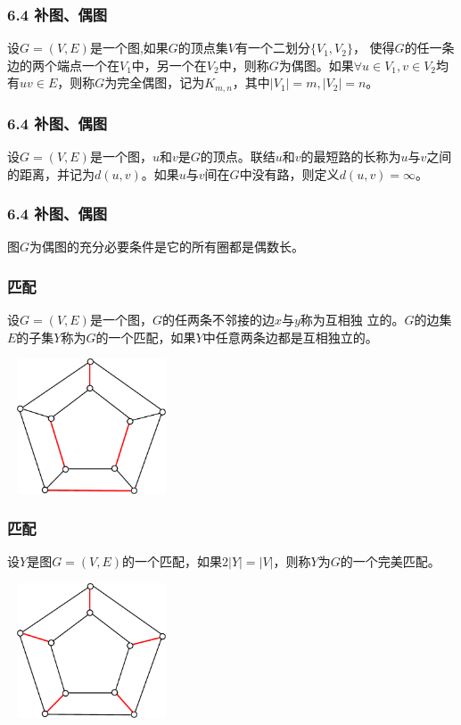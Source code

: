 \documentclass{beamer}
\begin{document}
\begin{CJK}{UTF8}{gbsn}
\begin{frame}
  \frametitle{6.4 补图、偶图}
  \begin{definition6.4.2}
    设$G=(V,E)$是一个图,如果$G$的顶点集$V$有一个二划分$\{V_1,V_2\}$，
    使得$G$的任一条边的两个端点一个在$V_1$中，另一个在$V_2$中，则称$G$为\alert{偶图}。如果$\forall u \in V_1, v \in V_2$均有$uv \in E$，则称$G$为\alert{完全偶图}，记为$K_{m,n}$，其中$|V_1|=m,|V_2|=n$。
  \end{definition6.4.2}
\end{frame}

\begin{frame}
  \frametitle{6.4 补图、偶图}
  \begin{definition6.4.3}
    设$G=(V,E)$是一个图，$u$和$v$是$G$的顶点。联结$u$和$v$的最短路的长称为$u$与$v$之间的\alert{距离}，并记为$d(u,v)$。如果$u$与$v$间在$G$中没有路，则定义$d(u,v)=\infty$。
  \end{definition6.4.3}
\end{frame}

\begin{frame}
  \frametitle{6.4 补图、偶图}
  \begin{theorem6.4.2}
    图$G$为偶图的充分必要条件是它的所有圈都是偶数长。
  \end{theorem6.4.2}
\end{frame}

\begin{frame}
  \frametitle{匹配}
  \begin{definition6.4.4}
    设$G=(V,E)$是一个图，$G$的任两条不邻接的边$x$与$y$称为互相\alert{独
      立}的。$G$的边集$E$的子集$Y$称为$G$的一个\alert{匹配}，如果$Y$中任意两条边都是互相独立的。
  \end{definition6.4.4}
\pause
\centering
\includegraphics[width=5cm,height=4cm]{matching}
\end{frame}
\begin{frame}
  \frametitle{匹配}
  \begin{definition6.4.5}
    设$Y$是图$G=(V,E)$的一个匹配，如果$2|Y|=|V|$，则称$Y$为$G$的一个\alert{完美匹配}。
  \end{definition6.4.5}
\pause
\centering
\includegraphics[width=5cm,height=4cm]{perfect}
\end{frame}


\end{CJK}
\end{document}
